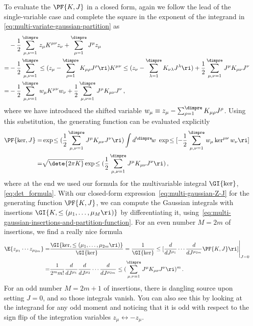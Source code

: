 To evaluate the  $\PF{K,J}$ in a closed form, again we follow the lead of the single-variable case and complete the square in the exponent of the integrand in \eqref{eq:multi-variate-gaussian-partition} as
\begin{align}
&-\frac{1}{2}\sum_{\mu,\nu=1}^{\dimpre} z_{\mu} K^{\mu\nu}z_{\nu}+\sum_{\mu=1}^{\dimpre}J^{\mu} z_{\mu}\, \\
=&-\frac{1}{2}\sum_{\mu,\nu=1}^{\dimpre} \le(z_{\mu}-\sum_{\rho=1}^{\dimpre}K_{\mu\rho}J^{\rho}\ri) K^{\mu\nu} \le(z_{\nu}-\sum_{\lambda=1}^{\dimpre}K_{\nu\lambda}J^{\lambda}\ri)+\frac{1}{2}\sum_{\mu,\nu=1}^{\dimpre}J^{\mu} K_{\mu\nu}J^{\nu}\, \nonumber\\
=&-\frac{1}{2}\sum_{\mu,\nu=1}^{\dimpre} w_{\mu}K^{\mu\nu}w_{\nu}+\frac{1}{2}\sum_{\mu,\nu=1}^{\dimpre}J^{\mu} K_{\mu\nu}J^{\nu}\, , \nonumber
\end{align}
where we have introduced the shifted variable $w_{\mu} \equiv z_{\mu}-\sum_{\rho=1}^{\dimpre}K_{\mu\rho}J^{\rho}$. Using this substitution, the generating function can be evaluated explicitly
\begin{align}\label{eq:multi-gaussian-Z-J}
\PF{\ker,J} =& \exp\!\le(\frac{1}{2}\sum_{\mu,\nu=1}^{\dimpre}J^{\mu} K_{\mu\nu}J^{\nu}\ri)  \int d^\dimpre\! w\ \exp\!\le[-\frac{1}{2}\sum_{\mu,\nu=1}^{\dimpre} w_{\mu}\ker^{\mu\nu}w_{\nu}\ri]\, \\
 =& \sqrt{\dete{2\pi K}} \exp\!\le(\frac{1}{2}\sum_{\mu,\nu=1}^{\dimpre}J^{\mu} K_{\mu\nu}J^{\nu}\ri) \, ,\nonumber
\end{align}
where at the end we used our formula for the multivariable integral $\GI{\ker}$,  \eqref{eq:det_formula}.
With our closed-form expression~\eqref{eq:multi-gaussian-Z-J} for the generating function $\PF{K,J}$, we can compute the Gaussian integrals with insertions $\GI{K, \le(\mu_1,\ldots,\mu_{M}\ri)}$ by differentiating it, using~\eqref{eq:multi-gaussian-insertions-and-partition-function}. For an even number $M=2m$ of insertions, we find a really nice formula
\begin{align}\label{eq:nice-formula-for-multivariable-moments}
\E{z_{\mu_1}\cdots z_{\mu_{2m}}}=&\frac{\GI{\ker, \le(\mu_1,\ldots,\mu_{2m}\ri)}}{\GI{\ker}}=\frac{1}{\GI{\ker}}\le[ \frac{d}{d J^{\mu_1}}\cdots  \frac{d}{d J^{\mu_{2m}}} \PF{K,J}\ri]\Bigg\vert_{J=0}\, \\
=&\frac{1}{2^m m!} \frac{d}{d J^{\mu_1}}  \frac{d}{d J^{\mu_2}}\cdots  \frac{d}{d J^{\mu_{2m}}}\le(\sum_{\mu,\nu=1}^{\dimpre}J^{\mu} K_{\mu\nu}J^{\nu}\ri)^m\, .\nonumber
\end{align}
For an odd number $M=2m+1$ of insertions, there is dangling source upon setting $J=0$, and so those integrals vanish. You can also see this by looking at the integrand for any odd moment and noticing that it is odd with respect to the sign flip of the integration variables $z_\mu \leftrightarrow -z_\mu$.

